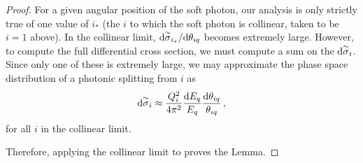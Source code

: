 \begin{proof}
    For a given angular position of the soft photon, our analysis is only strictly true of one value of \(i_*\) (the \(i\) to which the soft photon is collinear, taken to be \(i=1\) above).
    In the collinear limit, \(\dd\overset{\sim}{\sigma}_{i_*}/\dd\theta_{iq}\) becomes extremely large.
    However, to compute the full differential cross section, we must compute a sum on the \(\dd\overset{\sim}{\sigma}_i\).
    Since only one of these is extremely large, we may approximate the phase space distribution of a photonic splitting from \(i\) as
     \begin{align}
         \label{eq:collinear-photon-emission}
        \dsigmatilde_i
        \approx
        \frac{Q_i^2}{4\pi^2}
        \frac{\dd E_q}{E_q}
        \frac{\dd\theta_{iq}}{\theta_{iq}}
        \,,
    \end{align}
    for all \(i\) in the collinear limit.

    Therefore, applying the collinear limit to  proves the Lemma.
\end{proof}




\vspace{7pt}

